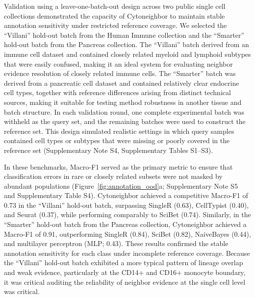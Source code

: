 \documentclass[11pt]{article}
\begin{document}
Validation using a leave-one-batch-out design across two public single cell collections demonstrated the capacity of Cytoneighbor to maintain stable annotation sensitivity under restricted reference coverage. We selected the ``Villani'' hold-out batch\cite{Villani2017Immune} from the Human Immune collection and the ``Smarter'' hold-out batch\cite{Muraro2016Pancreas} from the Pancreas collection\cite{Baron2016Pancreas,Segerstolpe2016Pancreas,Xin2016Pancreas,Lawlor2017Pancreas}. The ``Villani'' batch derived from an immune cell dataset and contained closely related myeloid and lymphoid subtypes that were easily confused, making it an ideal system for evaluating neighbor evidence resolution of closely related immune cells. The ``Smarter'' batch was derived from a pancreatic cell dataset and contained relatively clear endocrine cell types, together with reference differences arising from distinct technical sources, making it suitable for testing method robustness in another tissue and batch structure. In each validation round, one complete experimental batch was withheld as the query set, and the remaining batches were used to construct the reference set. This design simulated realistic settings in which query samples contained cell types or subtypes that were missing or poorly covered in the reference set (Supplementary Note S4, Supplementary Tables S1--S3).

In these benchmarks, Macro-F1\cite{Sokolova2009PerformanceMeasures} served as the primary metric to ensure that classification errors in rare or closely related subsets were not masked by abundant populations (Figure~\ref{fig:annotation_ood}a; Supplementary Note S5 and Supplementary Table S4). Cytoneighbor achieved a competitive Macro-F1 of 0.73 in the ``Villani'' hold-out batch, surpassing SingleR (0.63), CellTypist (0.40), and Seurat (0.37), while performing comparably to SciBet (0.74). Similarly, in the ``Smarter'' hold-out batch from the Pancreas collection, Cytoneighbor achieved a Macro-F1 of 0.91, outperforming SingleR (0.84), SciBet (0.82), NaiveBayes (0.44), and multilayer perceptron (MLP; 0.43). These results confirmed the stable annotation sensitivity for each class under incomplete reference coverage. Because the ``Villani'' hold-out batch exhibited a more typical pattern of lineage overlap and weak evidence, particularly at the CD14+ and CD16+ monocyte boundary, it was critical auditing the reliability of neighbor evidence at the single cell level was critical.
\end{document}
